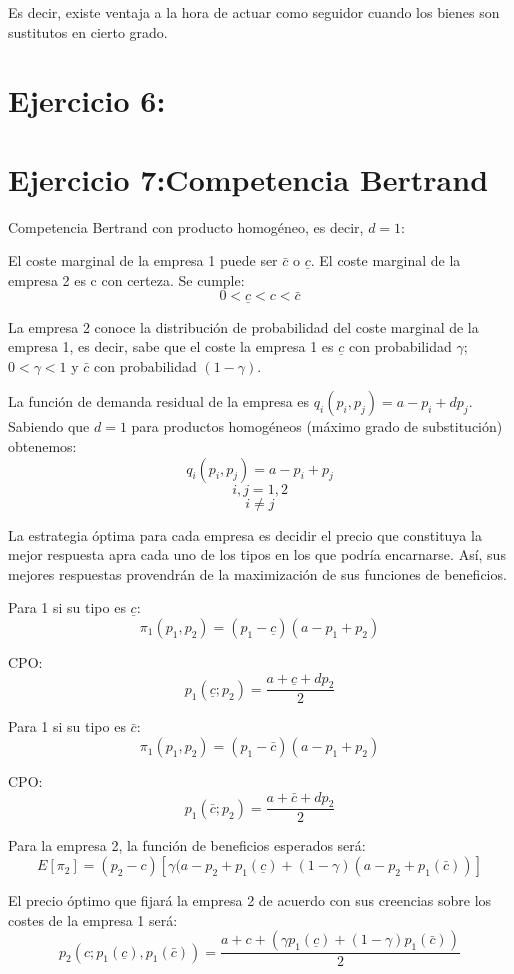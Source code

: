 \documentclass{article}
\theoremstyle{definition}
\theoremstyle{remark}
\begin{document}
\begin{Schunk}
\begin{Soutput}
Es decir, existe ventaja a la hora de actuar como seguidor cuando los bienes son sustitutos en cierto grado.

\section{Ejercicio 6:}
\section{Ejercicio 7:Competencia Bertrand}

Competencia Bertrand con producto homog\'eneo, es decir, $d=1$:

El coste marginal de la empresa 1 puede ser $\bar{c}$ o $\underline{c}$.
El coste marginal de la empresa 2 es c con certeza.
Se cumple:
$$0<\underline{c}<c<\bar{c}$$

La empresa 2 conoce la distribuci\'on de probabilidad del coste marginal de la empresa 1, es decir, sabe que el coste la empresa 1 es $\underline{c}$ con probabilidad $\gamma$; $0<\gamma<1$ y $\bar{c}$ con probabilidad $(1-\gamma)$.

La funci\'on de demanda residual de la empresa es $q_i(p_i,p_j)=a-p_i+dp_j$. Sabiendo que $d=1$ para productos homog\'eneos (m\'aximo grado de substituci\'on) obtenemos:
$$q_i(p_i,p_j)=a-p_i+p_j$$ $$i,j=1,2$$ $$i\neq j$$

La estrategia \'optima para cada empresa es decidir el precio que constituya la mejor respuesta apra cada uno de los tipos  en los que podr\'ia encarnarse. As\'i, sus mejores respuestas provendr\'an de la maximizaci\'on de sus funciones de beneficios.

Para 1 si su tipo es $\underline{c}$:
$$\pi_1(p_1,p_2)=(p_1-\underline{c})(a-p_1+p_2)$$

CPO:
$$p_1(\underline{c};p_2)=\frac{a+\underline{c}+dp_2}{2}$$

Para 1 si su tipo es $\bar{c}$:
$$\pi_1(p_1,p_2)=(p_1-\bar{c})(a-p_1+p_2)$$

CPO:
$$p_1(\bar{c};p_2)=\frac{a+\bar{c}+dp_2}{2}$$

Para la empresa 2, la funci\'on de beneficios esperados ser\'a:
$$E[\pi_2]=(p_2-c)[\gamma(a-p_2+p_1(\underline{c})+(1-\gamma)(a-p_2+p_1(\bar{c}))]$$

El precio \'optimo que fijar\'a la empresa 2 de acuerdo con sus creencias sobre los costes de la empresa 1 ser\'a:
$$p_2(c;p_1(\underline{c}),p_1(\bar{c}))=\frac{a+c+(\gamma p_1(\underline{c})+(1-\gamma)p_1(\bar{c}))}{2}$$


\end{Soutput}
\end{Schunk}
\end{document}
